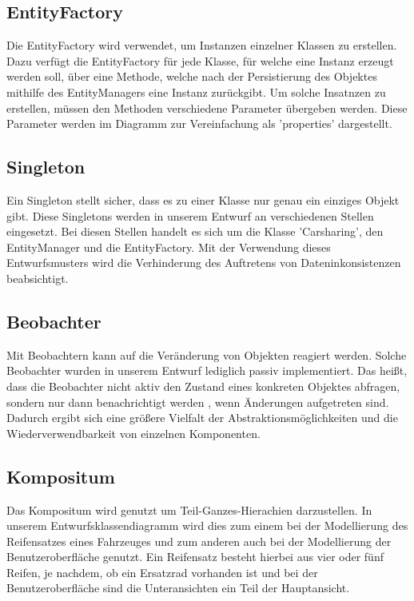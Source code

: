 \subsection{EntityFactory}
Die EntityFactory wird verwendet, um Instanzen einzelner Klassen zu erstellen. Dazu verfügt die EntityFactory für jede Klasse, für welche eine Instanz erzeugt werden soll, über eine Methode, welche nach der Persistierung des Objektes mithilfe des EntityManagers eine Instanz zurückgibt. Um solche Insatnzen zu erstellen, müssen den Methoden verschiedene Parameter übergeben werden. Diese Parameter werden im Diagramm zur Vereinfachung als 'properties' dargestellt.

\subsection{Singleton}
Ein Singleton stellt sicher, dass es zu einer Klasse nur genau ein einziges Objekt gibt. Diese Singletons werden in unserem Entwurf an verschiedenen Stellen eingesetzt. Bei diesen Stellen handelt es sich um die Klasse 'Carsharing', den EntityManager und die EntityFactory. Mit der Verwendung dieses Entwurfsmusters wird die Verhinderung des Auftretens von Dateninkonsistenzen beabsichtigt.

\subsection{Beobachter}
Mit Beobachtern kann auf die Veränderung von Objekten reagiert werden. Solche Beobachter wurden in unserem Entwurf lediglich passiv implementiert. Das heißt, dass die Beobachter nicht aktiv den Zustand eines konkreten Objektes abfragen, sondern nur dann benachrichtigt werden , wenn Änderungen aufgetreten sind. Dadurch ergibt sich eine größere Vielfalt der Abstraktionsmöglichkeiten und die Wiederverwendbarkeit von einzelnen Komponenten.

\subsection{Kompositum}
Das Kompositum wird genutzt um Teil-Ganzes-Hierachien darzustellen. In unserem Entwurfsklassendiagramm wird dies zum einem bei der Modellierung des Reifensatzes eines Fahrzeuges und zum anderen auch bei der Modellierung der Benutzeroberfläche genutzt. Ein Reifensatz besteht hierbei aus vier oder fünf Reifen, je nachdem, ob ein Ersatzrad vorhanden ist und bei der Benutzeroberfläche sind die Unteransichten ein Teil der Hauptansicht.